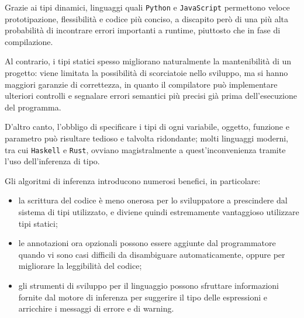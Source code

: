 \noindent Grazie ai tipi dinamici, linguaggi quali \texttt{Python} e \texttt{JavaScript} permettono
veloce prototipazione, flessibilità e codice più conciso, a discapito però di una più alta
probabilità di incontrare errori importanti a runtime, piuttosto che in fase di compilazione.


Al contrario, i tipi statici spesso migliorano naturalmente la mantenibilità di un progetto:
viene limitata la possibilità di scorciatoie nello sviluppo, ma si hanno maggiori garanzie di correttezza,
in quanto il compilatore può implementare ulteriori controlli e segnalare errori semantici più precisi già
prima dell'esecuzione del programma.

\noindent D'altro canto, l'obbligo di specificare i tipi di ogni variabile, oggetto, funzione e
parametro può risultare tedioso e talvolta ridondante; molti linguaggi moderni,
tra cui \texttt{Haskell} e \texttt{Rust}, ovviano magistralmente a quest'inconvenienza tramite
l'uso dell'inferenza di tipo.

\noindent Gli algoritmi di inferenza introducono numerosi benefici, in particolare:
\begin{itemize}
    \item la scrittura del codice è meno onerosa per lo sviluppatore a prescindere dal sistema di tipi utilizzato,
          e diviene quindi estremamente vantaggioso utilizzare tipi statici;
    \item le annotazioni ora opzionali possono essere aggiunte dal programmatore quando vi sono casi difficili
          da disambiguare automaticamente, oppure per migliorare la leggibilità del codice;
    \item gli strumenti di sviluppo per il linguaggio possono sfruttare informazioni fornite dal motore di inferenza
          per suggerire il tipo delle espressioni e arricchire i messaggi di errore e di warning.
\end{itemize}